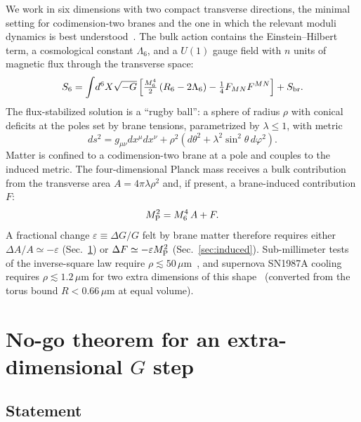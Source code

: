 \documentclass[aps,prd,reprint,superscriptaddress,nofootinbib,floatfix]{revtex4-2}
\theoremstyle{definition}
\newcommand{\MP}{M_{\rm P}}
\newcommand{\um}{\,\mu\mathrm{m}}
\begin{document}
We work in six dimensions with two compact transverse directions, the minimal setting for codimension-two branes and the one in which the relevant moduli dynamics is best understood~\cite{CarrollGuica2003,Navarro2003,GarrigaPorrati2004,ABPQ2004,GGP2004}. The bulk action contains the Einstein--Hilbert term, a cosmological constant $\Lambda_6$, and a $U(1)$ gauge field with $n$ units of magnetic flux through the transverse space:
\begin{equation}
S_6 = \int\! d^6X\sqrt{-G}\left[\tfrac{M_6^4}{2}\left(R_6 - 2\Lambda_6\right) - \tfrac14 F_{MN}F^{MN}\right] + S_{\rm br}.
\end{equation}
The flux-stabilized solution is a ``rugby ball'': a sphere of radius $\rho$ with conical deficits at the poles set by brane tensions, parametrized by $\lambda\le1$, with metric
\begin{equation}
ds^2 = g_{\mu\nu}dx^\mu dx^\nu + \rho^2\left(d\theta^2 + \lambda^2\sin^2\theta\, d\varphi^2\right).
\end{equation}
Matter is confined to a codimension-two brane at a pole and couples to the induced metric. The four-dimensional Planck mass receives a bulk contribution from the transverse area $A = 4\pi\lambda\rho^2$ and, if present, a brane-induced contribution $F$:
\begin{equation}
\MP^2 = M_6^4\, A + F. \label{eq:MP}
\end{equation}
A fractional change $\varepsilon \equiv \Delta G/G$ felt by brane matter therefore requires either $\Delta A/A \simeq -\varepsilon$ (Sec.~\ref{sec:nogo}) or $\Delta F \simeq -\varepsilon\MP^2$ (Sec.~\ref{sec:induced}). Sub-millimeter tests of the inverse-square law require $\rho\lesssim 50\um$~\cite{Kapner2007,Lee2020}, and supernova SN1987A cooling requires $\rho\lesssim1.2\um$ for two extra dimensions of this shape~\cite{HannestadRaffelt2003} (converted from the torus bound $R<0.66\um$ at equal volume).

\section{No-go theorem for an extra-dimensional $G$ step}\label{sec:nogo}

\subsection{Statement}
\end{document}
